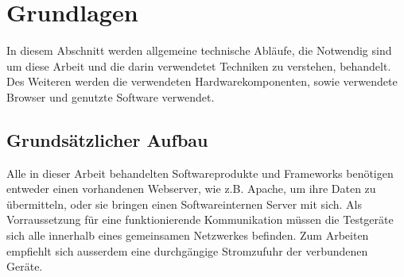\chapter{Grundlagen}
In diesem Abschnitt werden allgemeine technische Abläufe, die Notwendig sind um diese Arbeit und die darin verwendetet Techniken zu verstehen, behandelt. Des Weiteren werden die verwendeten Hardwarekomponenten, sowie verwendete Browser und genutzte Software verwendet.


	\section{Grundsätzlicher Aufbau}
	Alle in dieser Arbeit behandelten Softwareprodukte und Frameworks benötigen entweder einen vorhandenen Webserver, wie z.B. Apache, um ihre Daten zu übermitteln, oder sie bringen einen Softwareinternen Server mit sich. Als Vorraussetzung für eine funktionierende Kommunikation müssen die Testgeräte sich alle innerhalb eines gemeinsamen Netzwerkes befinden. Zum Arbeiten empfiehlt sich ausserdem eine durchgängige Stromzufuhr der verbundenen Geräte.
	
